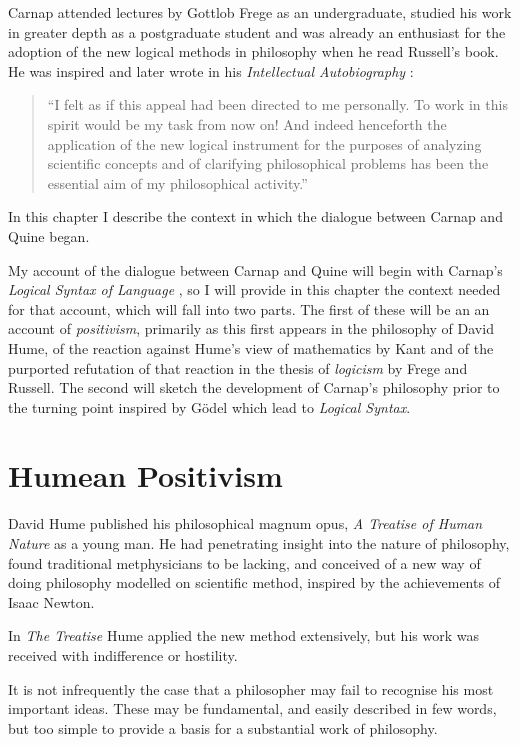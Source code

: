 Carnap attended lectures by Gottlob Frege as an undergraduate, studied his work in greater depth as a postgraduate student
and was already an enthusiast for the adoption of the new logical methods in philosophy when he read Russell's
book.
He was inspired and later wrote in his \emph{Intellectual Autobiography}
\cite{carnap63,schilpp63}:

\begin{quotation}
``I felt as if this appeal had been directed to me personally.
To work in this spirit would be my task from now on! And indeed henceforth the application of the new logical instrument for the purposes of analyzing scientific concepts and of clarifying philosophical problems has been the essential aim of my philosophical activity.''
\end{quotation}

In this chapter I describe the context in which the dialogue between
Carnap and Quine began.

My account of the dialogue between Carnap and Quine will begin with Carnap's {\it Logical Syntax of Language} \cite{carnap34, carnap37}, so I will provide in this chapter the context needed for that account, which will fall into two parts.
The first of these will be an an account of \emph{positivism}, primarily as this first appears in the philosophy of David Hume, of the reaction against Hume's view of mathematics by Kant and of the purported refutation of that reaction in the thesis of \emph{logicism} by Frege and Russell.
The second will sketch the development of Carnap's philosophy prior to the turning point inspired by G\"odel which lead to {\it Logical Syntax}.

\section{Humean Positivism}

David Hume published his philosophical magnum opus, \emph{A Treatise of Human Nature} \cite{hume39}
as a young man.
He had penetrating insight into the nature of philosophy, found traditional metphysicians to
be lacking, and conceived of a new way of doing philosophy modelled on scientific method, inspired by the achievements of Isaac Newton.

In \emph{The Treatise} Hume applied the new method extensively, but his work
was received with indifference or hostility.

It is not infrequently the case that a philosopher may fail to recognise
his most important ideas.
These may be fundamental, and easily described in few words, but too simple
to provide a basis for a substantial work of philosophy.

